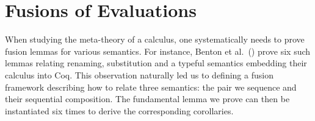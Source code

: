 \chapter{Fusions of Evaluations}

When studying the meta-theory of a calculus, one systematically
needs to prove fusion lemmas for various semantics. For instance,
Benton et al.~(\citeyear{benton2012strongly}) prove six such lemmas
relating renaming, substitution and a typeful semantics embedding
their calculus into Coq. This observation naturally led us to
defining a fusion framework describing how to relate three semantics:
the pair we sequence and their sequential composition. The fundamental
lemma we prove can then be instantiated six times
to derive the corresponding corollaries.
